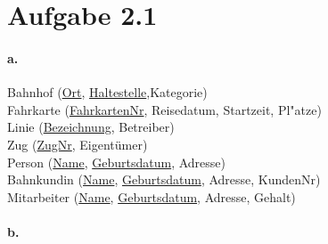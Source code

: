 \documentclass[12pt]{article}
\begin{document}
	
	
	
	
	\section*{Aufgabe 2.1}
	
	
	
		

		\paragraph*{a.}
			Bahnhof (\underline{Ort}, \underline{Haltestelle},Kategorie)\\[1.3em]
			
			Fahrkarte (\underline{FahrkartenNr}, Reisedatum, Startzeit, Pl"atze)\\[1.3em]
			
			Linie (\underline{Bezeichnung}, Betreiber)\\[1.3em]
			
			Zug (\underline{ZugNr}, Eigentümer)\\[1.3em]
			
			Person (\underline{Name}, \underline{Geburtsdatum}, Adresse) \\[1,3em]
			
			Bahnkundin (\underline{Name}, \underline{Geburtsdatum}, Adresse, KundenNr)\\[1,3em]
			
			Mitarbeiter (\underline{Name}, \underline{Geburtsdatum},  Adresse, Gehalt)\\[1,3em]
		
		
		\paragraph*{b.}	
			
\end{document}
